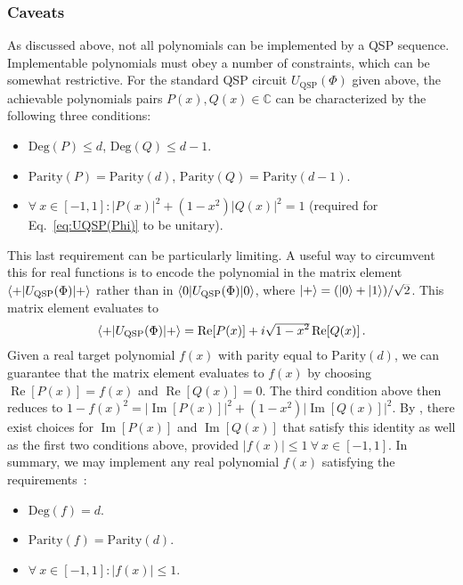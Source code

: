 \begin{refsection}
\subsubsection*{Caveats}
As discussed above, not all polynomials can be implemented by a QSP sequence. Implementable polynomials must obey a number of constraints, which can be somewhat restrictive. For the standard QSP circuit $U_{\mathrm{QSP}}(\Phi)$ given above, the achievable polynomials pairs $P(x), Q(x) \in \mathbb{C}$ can be characterized by the following three conditions:
\begin{itemize}
    \item $\mathrm{Deg}(P) \leq d$, \;\; $\mathrm{Deg}(Q) \leq d-1$.
    \item $\mathrm{Parity}(P) = \mathrm{Parity}(d)$, \;\; $\mathrm{Parity}(Q) = \mathrm{Parity}(d-1)$.
    \item $\forall~x \in [-1, 1]: |P(x)|^2 + (1-x^2) |Q(x)|^2 = 1$ (required for Eq.~\eqref{eq:UQSP(Phi)} to be unitary).\end{itemize}
This last requirement can be particularly limiting. A useful way to circumvent this for real functions is to encode the polynomial in the matrix element $\langle+\rvert U_{\mathrm{QSP}}(\Phi) \lvert+\rangle $ rather than in $\langle0\rvert U_{\mathrm{QSP}}(\Phi) \lvert0\rangle$, where $\lvert+\rangle = \smash{(\lvert0\rangle+\lvert1\rangle)/\sqrt{2}}$. This matrix element evaluates to 
\begin{equation}
\langle+\rvert U_{\mathrm{QSP}}(\Phi) \lvert+\rangle = \operatorname{Re}[P(x)] + i\sqrt{1-\smash{x^2}} \operatorname{Re}[Q(x)]\,.
\end{equation}
Given a real target polynomial $f(x)$ with parity equal to $\mathrm{Parity}(d)$, we can guarantee that the matrix element evaluates to $f(x)$ by choosing $\operatorname{Re}[P(x)] = f(x)$ and $\operatorname{Re}[Q(x)] = 0$. The third condition above then reduces to $1-f(x)^2 = \lvert \operatorname{Im}[P(x)]\rvert^2 + (1-x^2)\lvert \operatorname{Im}[Q(x)]\rvert^2$. By \cite[Lemma 6]{gilyen2018QSingValTransf}, there exist choices for $\operatorname{Im}[P(x)]$ and $\operatorname{Im}[Q(x)]$ that satisfy this identity as well as the first two conditions above, provided $|f(x)| \leq 1~\forall~x \in [-1, 1]$. In summary, we may implement any real polynomial $f(x)$ satisfying the requirements~\cite[Corollary 10]{gilyen2018QSingValTransf}:
\begin{itemize}
    \item $\mathrm{Deg}(f) = d$.
    \item $\mathrm{Parity}(f) = \mathrm{Parity}(d)$.
    \item $\forall~x \in [-1, 1]: |f(x)| \leq 1$.
\end{itemize}



\end{refsection}

